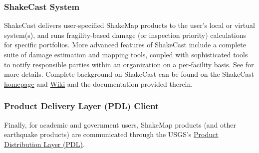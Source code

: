 \documentclass[letterpaper,10pt,english]{sphinxmanual}
\begin{document}
\subsubsection{ShakeCast System}
\label{products:shakecast-system}
ShakeCast delivers user-specified ShakeMap products to the user’s
local or virtual system(s), and runs fragility-based damage (or
inspection priority) calculations for specific portfolios. More advanced
features of ShakeCast include a complete suite of damage
estimation and mapping tools, coupled with sophisticated tools to notify
responsible parties within an organization on a per-facility basis. See
{\hyperref[related_systems:sec\string-related\string-systems]{}} for more details. Complete background on ShakeCast
can be found on the ShakeCast \href{http://earthquake.usgs.gov/research/software/shakecast/}{homepage} and \href{https://my.usgs.gov/confluence/display/ShakeCast/Home}{Wiki} and the documentation provided therein.


\subsubsection{Product Delivery Layer (PDL) Client}
\label{products:product-delivery-layer-pdl-client}
Finally, for academic and government users, ShakeMap products (and other
earthquake products) are communicated through the USGS’s \href{http://earthquake.usgs.gov/research/software/\#PDL}{Product Distribution
Layer (PDL)}.
\end{document}
